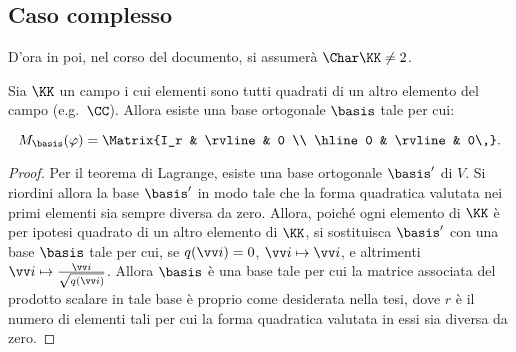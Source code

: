 \subsection{Caso complesso}

\begin{note}
	D'ora in poi, nel corso del documento, si assumerà $\Char \KK \neq 2$.
\end{note}

\begin{theorem}
	Sia $\KK$ un campo i cui elementi sono tutti quadrati di un
	altro elemento del campo (e.g.~$\CC$). Allora esiste una base
	ortogonale $\basis$ tale per cui:
	
	\[ M_\basis(\varphi) = \Matrix{I_r & \rvline & 0 \\ \hline 0 & \rvline & 0\,}. \]
\end{theorem}

\begin{proof}
	Per il teorema di Lagrange, esiste una base ortogonale $\basis'$ di $V$.
	Si riordini allora la base $\basis'$ in modo tale che la forma quadratica valutata nei primi elementi sia sempre diversa da zero. Allora, poiché ogni
	elemento di $\KK$ è per ipotesi quadrato di un altro elemento
	di $\KK$, si sostituisca $\basis'$ con una base $\basis$ tale per
	cui, se $q(\vv i) = 0$, $\vv i \mapsto \vv i$, e altrimenti
	$\vv i \mapsto \frac{\vv i}{\sqrt{q(\vv i)}}$. Allora $\basis$
	è una base tale per cui la matrice associata del prodotto scalare
	in tale base è proprio come desiderata nella tesi, dove $r$ è
	il numero di elementi tali per cui la forma quadratica valutata
	in essi sia diversa da zero.
\end{proof}

